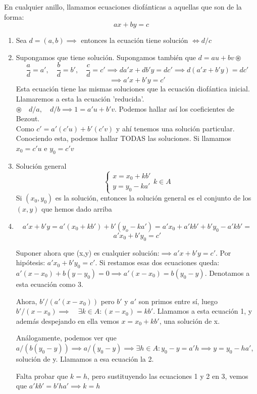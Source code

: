 \documentclass[11pt, a4paper, titlepage]{article}
\makeatletter
\renewenvironment{proof}[1][\proofname] {\vspace{-15pt}\par\pushQED{\qed}\normalfont\topsep6\p@\@plus6\p@\relax\trivlist\item[\hskip\labelsep\it#1\@addpunct{.}]\ignorespaces}{\popQED\endtrivlist\@endpefalse}
\theoremstyle{theorem-style}
\theoremstyle{definition-style}
\theoremstyle{remark-style}
\theoremstyle{example-style}
\newenvironment{nlist}
{\begin{enumerate}
\renewcommand\labelenumi{(\emph{\roman{enumi})}}}
{\end{enumerate}}
\makeatother
\begin{document}
En cualquier anillo, llamamos ecuaciones diofánticas a aquellas que son de la forma:
\[
ax +by  = c
\]
\begin{nlist}
	\item Sea $d=(a,b)\implies$ entonces la ecuación tiene solución $\iff d/c$
	\item Supongamos que tiene solución. Supongamos también que $d= au+bv \circledast$
\[
\frac{a}{d}= a',\quad \frac{b}{d}=b',\quad \frac{c}{d}=c'\implies da'x + db'y = dc' \implies d(a'x+b'y)=dc'\]
\[ \implies a'x+b'y = c'
\]
Esta ecuación tiene las mismas soluciones que la ecuación diofántica inicial. Llamaremos a esta la ecuación 'reducida'.\\
$\circledast\quad d/a ,\quad d/b \implies 1=a'u +b 'v $. Podemos hallar así los coeficientes de Bezout.\\

Como $c'= a'(c'u)+b'(c'v)$ y ahí tenemos una solución particular. Conociendo esta, podemos hallar TODAS las soluciones. Si llamamos $x_0 =c'u$ e $y_0 = c'v$

\item Solución general \[\begin{cases}
	x = x_0 +kb'\\
	y= y_0 -ka'
\end{cases} k\in A\]
Si $(x_0,y_0)$ es la solución, entonces la solución general es el conjunto de los $(x,y)$ que hemos dado arriba
\\
\begin{proof}[Demostración de iii)]

\[
a'x + b'y = a'(x_0 +kb') + b'(y_o - ka') = a'x_0 + a'kb' + b'y_0 - a'kb' = 
\]
\[
a'x_0 +b'y_0 = c'
\]

Suponer ahora que (x,y) es cualquier solución:$\implies a'x +b'y = c'$. Por hipótesis: $a'x_0 +b'y_0 = c'$. Si restamos esas dos ecuaciones queda: $a'(x-x_0) +b(y-y_0) = 0 \implies a'(x-x_0) = b(y_0-y)$. Denotamos a esta ecuación como 3.

Ahora, $b'/(a'(x-x_0))$ pero $b'$ y $a'$ son primos entre sí, luego $b'/(x-x_0)\implies \quad \exists k \in A : (x-x_0) = kb'$. Llamamos a esta ecuación 1, y además despejando en ella vemos $x = x_0 + kb'$, una solución de x.

Análogamente, podemos ver que $a/(b(y_0-y)) \implies a/(y_0-y) \implies \exists h \in A: y_0 -y = a'h \implies y = y_0 - ha'$, solución de y. Llamamos a esa ecuación la 2.

Falta probar que $k = h$, pero sustituyendo las ecuaciones 1 y 2 en 3, vemos que $a'kb'  = b'ha' \implies k = h$
	
\end{proof}

\end{nlist}
\end{document}
